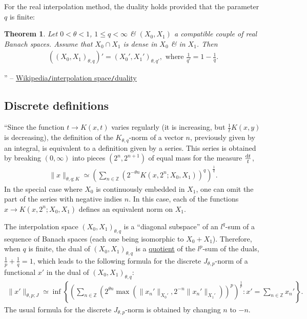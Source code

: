 \documentclass[oneside]{book}
\numberwithin{equation}{section}
\newtheorem{theorem}{Theorem}[chapter]
\begin{document}
For the real interpolation method, the duality holds provided that the parameter $q$ is finite:

\begin{theorem}
	Let $0 < \theta < 1$, $1\le q < \infty$ \& $(X_0,X_1)$ a compatible couple of real Banach spaces. Assume that $X_0\cap X_1$ is dense in $X_0$ \& in $X_1$. Then
	\begin{align*}
		\left((X_0,X_1)_{\theta,q}\right)' = (X_0',X_1')_{\theta,q'},\mbox{ where }\frac{1}{q'} = 1 - \frac{1}{q}.
	\end{align*}
\end{theorem}
\noindent'' -- \href{https://en.wikipedia.org/wiki/Interpolation_space#Duality}{Wikipedia\texttt{/}interpolation space\texttt{/}duality}

\subsection{Discrete definitions}
``Since the function $t\to K(x,t)$ varies regularly (it is increasing, but $\frac{1}{t}K(x,y)$ is decreasing), the definition of the $K_{\theta,q}$-norm of a vector $n$, previously given by an integral, is equivalent to a definition given by a series. This series is obtained by breaking $(0,\infty)$ into pieces $(2^n,2^{n+1})$ of equal mass for the measure $\frac{{\rm d}t}{t}$,
\begin{align*}
	\|x\|_{\theta,q;K}\simeq\left(\sum_{n\in\mathbb{Z}} \left(2^{-\theta n}K(x,2^n;X_0,X_1)\right)^q\right)^{\frac{1}{q}}.
\end{align*}
In the special case where $X_0$ is continuously embedded in $X_1$, one can omit the part of the series with negative indies $n$. In this case, each of the functions $x\to K(x,2^n;X_0,X_1)$ defines an equivalent norm on $X_1$.

The interpolation space $(X_0,X_1)_{\theta,q}$ is a ``diagonal subspace'' of an $l^q$-sum of a sequence of Banach spaces (each one being isomorphic to $X_0 + X_1$). Therefore, when $q$ is finite, the dual of $(X_0,X_1)_{\theta,q}$ is a \href{https://en.wikipedia.org/wiki/Banach_space#General_theory}{quotient} of the $l^p$-sum of the duals, $\frac{1}{p} + \frac{1}{q} = 1$, which leads to the following formula for the discrete $J_{\theta,p}$-norm of a functional $x'$ in the dual of $(X_0,X_1)_{\theta,q}$:
\begin{align*}
	\|x'\|_{\theta,p;J}\simeq\inf\left\{\left(\sum_{n\in\mathbb{Z}} \left(2^{\theta n}\max\left(\|x_n'\|_{X_0'},2^{-n}\|x_n'\|_{X_1'}\right)\right)^p\right)^{\frac{1}{p}}:x' = \sum_{n\in\mathbb{Z}} x_n'\right\}.
\end{align*}
The usual formula for the discrete $J_{\theta,p}$-norm is obtained by changing $n$ to $-n$.
\end{document}
